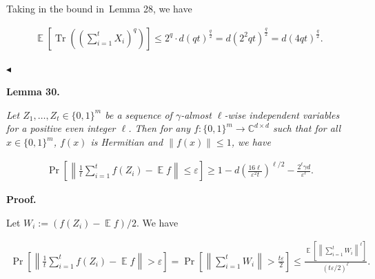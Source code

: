 \documentclass[10pt,a4paper]{article}
\begin{document}
Taking in the bound in Lemma 28, we have\par


\[\begin{gathered}
\operatorname*{\mathbb{E}}\left[\operatorname*{Tr}\left(\left(\sum_{i=1}^{t}X_{i}\right)^{q}\right)\right]\leq 2^{q}\cdot d(qt)^{\frac{q}{2}}=d\left(2^{2}qt\right)^{\frac{q}{2}}=d\left(4qt\right)^{\frac{q}{2}}.\
\end{gathered}\]


$\blacktriangleleft$\par





\par\medskip\noindent\textbf{
\textbf{Lemma 30}\textbf{.}
}\par



\emph{Let $Z_{1},\dots,Z_{t}\in\{0,1\}^{m}$ be a sequence of $\gamma$-almost $\ell$-wise independent variables for a positive even integer $\ell$. Then for any $f:\{0,1\}^{m}\to\mathbb{C}^{d\times d}$ such that for all $x\in\{0,1\}^{m}$, $f(x)$ is Hermitian and $\|f(x)\|\leq 1$, we have}\par


\[\begin{gathered}
\Pr\left[\left\lVert\frac{1}{t}\sum_{i=1}^{t}f(Z_{i})-\operatorname*{\mathbb{E}}f\right\rVert\leq\varepsilon\right]\geq 1-d\left(\frac{16\ell}{\varepsilon^{2}t}\right)^{\ell/2}-\frac{2^{\ell}\gamma d}{\varepsilon^{\ell}}.
\end{gathered}\]







\par\medskip\noindent\textbf{Proof.}\par




Let $W_{i}:=(f(Z_{i})-\operatorname*{\mathbb{E}}f)/2$.
We have\par


\[\begin{gathered}
\displaystyle\Pr\left[\left\lVert\frac{1}{t}\sum_{i=1}^{t}f(Z_{i})-\operatorname*{\mathbb{E}}f\right\rVert>\varepsilon\right]=\Pr\left[\left\lVert\sum_{i=1}^{t}W_{i}\right\rVert>\frac{t\varepsilon}{2}\right]\leq\frac{\operatorname*{\mathbb{E}}\left[\left\lVert\sum_{i=1}^{t}W_{i}\right\rVert^{\ell}\right]}{(t\varepsilon/2)^{\ell}}.
\end{gathered}\]
\end{document}
